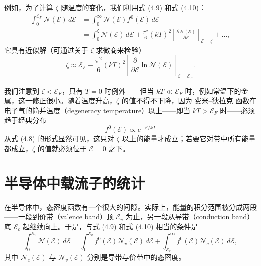 例如，为了计算 $\zeta$ 随温度的变化，我们利用式 (4.9) 和式 (4.10)：
\begin{align*}
\int_0^{\mathcal{E}_F} \mathcal{N}(\mathcal{E})\,d\mathcal{E} &= \int_0^{\infty} \mathcal{N}(\mathcal{E})f^0(\mathcal{E})\,d\mathcal{E} \\
&= \int_0^{\zeta} \mathcal{N}(\mathcal{E})\,d\mathcal{E} + \frac{\pi^2}{6}(kT)^2\left[\frac{\partial \mathcal{N}(\mathcal{E})}{\partial \mathcal{E}}\right]_{\mathcal{E}=\zeta} + \ldots,
\tag{4.22}
\end{align*}
它具有近似解（可通过关于 $\zeta$ 求微商来检验）
\begin{equation*}
\zeta \approx \mathcal{E}_F - \frac{\pi^2}{6}(kT)^2\left[\frac{\partial}{\partial \mathcal{E}}\ln \mathcal{N}(\mathcal{E})\right]_{\mathcal{E}=\mathcal{E}_F}.
\tag{4.23}
\end{equation*}


我们注意到 $\zeta<\mathcal{E}_F$，只有 $T=0$ 时例外——但当 $kT\ll\mathcal{E}_F$ 时，例如常温下的金属，这一修正很小。随着温度升高，$\zeta$ 的值不得不下降，因为 费米–狄拉克 函数在电子气的简并温度（degeneracy temperature）以上——即当 $kT>\mathcal{E}_F$ 时——必须趋于经典分布
\begin{equation*}
f^0(\mathcal{E})\propto e^{-\mathcal{E}/kT}
\tag{4.24}
\end{equation*}
从式 (4.8) 的形式显然可见，这只对 $\zeta$ 以上的能量才成立；若要它对带中所有能量都成立，$\zeta$ 的值就必须位于 $\mathcal{E}=0$ 之下。

\section{半导体中载流子的统计}

在半导体中，态密度函数有一个很大的间隙。实际上，能量的积分范围被分成两段——一段到价带（valence band）顶 $\mathcal{E}_v$ 为止，另一段从导带（conduction band）底 $\mathcal{E}_c$ 起继续向上。于是，与式 (4.9) 和式 (4.10) 相当的条件是
\begin{equation*}
\int_0^{\mathcal{E}_v} \mathcal{N}(\mathcal{E})\,d\mathcal{E} = \int_0^{\mathcal{E}_v} f^0(\mathcal{E})\mathcal{N}_v(\mathcal{E})\,d\mathcal{E} + \int_{\mathcal{E}_c}^{\infty} f^0(\mathcal{E})\mathcal{N}_c(\mathcal{E})\,d\mathcal{E},
\tag{4.25}
\end{equation*}
其中 $\mathcal{N}_c(\mathcal{E})$ 与 $\mathcal{N}_v(\mathcal{E})$ 分别是导带与价带中的态密度。


